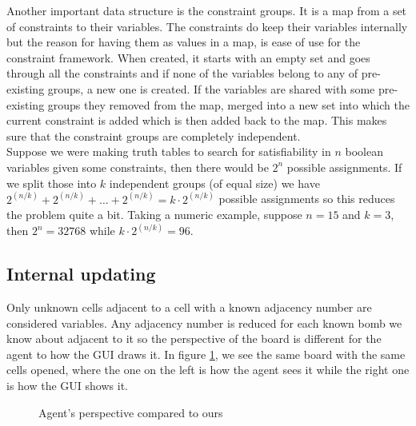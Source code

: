 \documentclass[11pt,a4paper,notitlepage]{article}
\theoremstyle{definition}
\begin{document}
Another important data structure is the constraint groups. It is a map from a set of constraints to their variables. The constraints do keep their variables internally but the reason for having them as values in a map, is ease of use for the constraint framework. When created, it starts with an empty set and goes through all the constraints and if none of the variables belong to any of pre-existing groups, a new one is created. If the variables are shared with some pre-existing groups they removed from the map, merged into a new set into which the current constraint is added which is then added back to the map. This makes sure that the constraint groups are completely independent.\\

Suppose we were making truth tables to search for satisfiability in $n$ boolean variables given some constraints, then there would be $2^n$ possible assignments. If we split those into $k$ independent groups (of equal size) we have $2^{(n/k)} + 2^{(n/k)} + \ldots + 2^{(n/k)} = k\cdot 2^{(n/k)}$ possible assignments so this reduces the problem quite a bit. Taking a numeric example, suppose $n = 15$ and $k = 3$, then $2^n =32768$ while $k \cdot 2^{(n/k)} = 96$.\\

\subsection{Internal updating}
Only unknown cells adjacent to a cell with a known adjacency number are considered variables. Any adjacency number is reduced for each known bomb we know about adjacent to it so the perspective of the board is different for the agent to how the GUI draws it. In figure \ref{fig:aper}, we see the same board with the same cells opened, where the one on the left is how the agent sees it while the right one is how the GUI shows it.
\begin{figure}[H]
\begin{center}
\hspace{2cm}
\end{center}
\caption{Agent's perspective compared to ours}
\label{fig:aper}
\end{figure}
\end{document}

